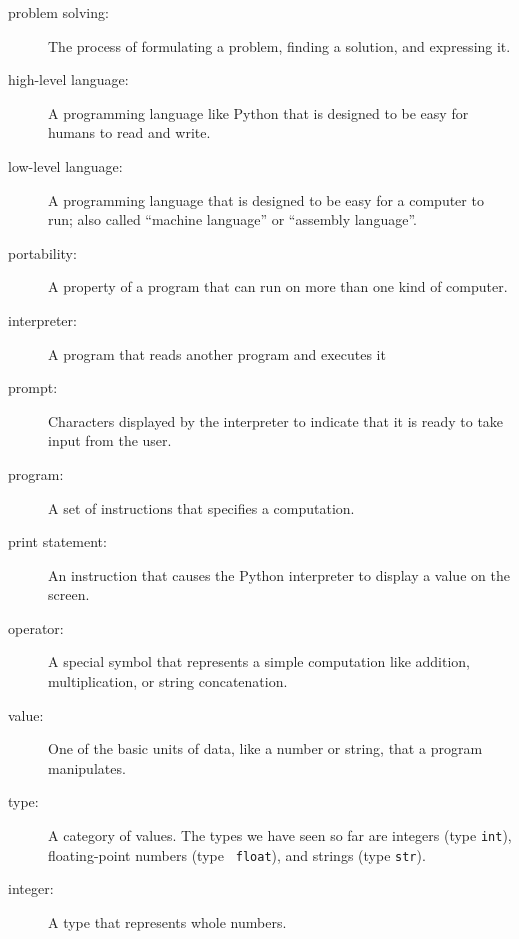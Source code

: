 \documentclass[10pt]{book}
\begin{document}
\begin{description}

\item[problem solving:]  The process of formulating a problem, finding
a solution, and expressing it.

\item[high-level language:]  A programming language like Python that
is designed to be easy for humans to read and write.

\item[low-level language:]  A programming language that is designed
to be easy for a computer to run; also called ``machine language'' or
``assembly language''.

\item[portability:]  A property of a program that can run on more
than one kind of computer.

\item[interpreter:]  A program that reads another program and executes
it

\item[prompt:] Characters displayed by the interpreter to indicate
that it is ready to take input from the user.

\item[program:] A set of instructions that specifies a computation.

\item[print statement:]  An instruction that causes the Python
interpreter to display a value on the screen.

\item[operator:]  A special symbol that represents a simple computation like
addition, multiplication, or string concatenation.

\item[value:]  One of the basic units of data, like a number or string,
that a program manipulates.

\item[type:] A category of values.  The types we have seen so far
are integers (type {\tt int}), floating-point numbers (type {\tt
float}), and strings (type {\tt str}).

\item[integer:] A type that represents whole numbers.


\end{description}
\end{document}
